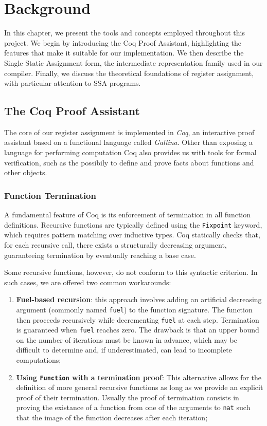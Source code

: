 
\chapter{Background}
\label{cha:background}

In this chapter, we present the tools and concepts employed throughout this project. We begin by introducing the Coq Proof Assistant, highlighting the features that make it suitable for our implementation. We then describe the Single Static Assignment form, the intermediate representation family used in our compiler. Finally, we discuss the theoretical foundations of register assignment, with particular attention to SSA programs.

\section{The Coq Proof Assistant}

The core of our register assignment is implemented in \textit{Coq}, an interactive proof assistant based on a functional language called \textit{Gallina}. Other than exposing a language for performing computation Coq also provides us with tools for formal verification, such as the possibily to define and prove facts about functions and other objects.

\subsection{Function Termination}
\label{subsec:funterm}

A fundamental feature of Coq is its enforcement of termination in all function definitions. Recursive functions are typically defined using the \texttt{Fixpoint} keyword, which requires pattern matching over inductive types. Coq statically checks that, for each recursive call, there exists a structurally decreasing argument, guaranteeing termination by eventually reaching a base case.

Some recursive functions, however, do not conform to this syntactic criterion. In such cases, we are offered two common workarounds:

\begin{enumerate}
    \item \textbf{Fuel-based recursion}: this approach involves adding an artificial decreasing argument (commonly named \texttt{fuel}) to the function signature. The function then proceeds recursively while decrementing \texttt{fuel} at each step. Termination is guaranteed when \texttt{fuel} reaches zero. The drawback is that an upper bound on the number of iterations must be known in advance, which may be difficult to determine and, if underestimated, can lead to incomplete computations;
    \item \textbf{Using \texttt{Function} with a termination proof}: This alternative allows for the definition of more general recursive functions as long as we provide an explicit proof of their termination. Usually the proof of termination consists in proving the existance of a function from one of the arguments to \texttt{nat} such that the image of the function decreases after each iteration;
\end{enumerate}

